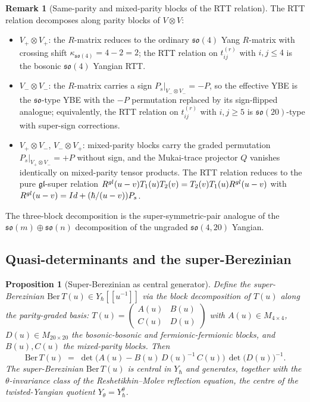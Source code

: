 \documentclass{article}
\providecommand{\fgl}{\mathfrak{gl}}
\providecommand{\fso}{\mathfrak{so}}
\providecommand{\Id}{\mathrm{Id}}
\providecommand{\Ber}{\mathrm{Ber}}
\newtheorem{proposition}[theorem]{Proposition}
\theoremstyle{definition}
\newtheorem{remark}[theorem]{Remark}
\begin{document}
\begin{remark}[Same-parity and mixed-parity blocks of the RTT relation]
\label{rem:r10-RTT-block-structure}
The RTT relation decomposes along parity blocks of $V \otimes V$:
\begin{itemize}
\item $V_+ \otimes V_+$: the $R$-matrix reduces to the ordinary
  $\fso(4)$ Yang $R$-matrix with crossing shift $\kappa_{\fso(4)} =
  4 - 2 = 2$; the RTT relation on $t^{(r)}_{ij}$ with $i, j \leq 4$
  is the bosonic $\fso(4)$ Yangian RTT.
\item $V_- \otimes V_-$: the $R$-matrix carries a sign
  $P_s|_{V_- \otimes V_-} = -P$, so the effective YBE is the
  $\fso$-type YBE with the $-P$ permutation replaced by its
  sign-flipped analogue; equivalently, the RTT relation on
  $t^{(r)}_{ij}$ with $i, j \geq 5$ is $\fso(20)$-type with
  super-sign corrections.
\item $V_+ \otimes V_-$, $V_- \otimes V_+$: mixed-parity blocks
  carry the graded permutation $P_s|_{V_+ \otimes V_-} = +P$ without
  sign, and the Mukai-trace projector $Q$ vanishes identically on
  mixed-parity tensor products. The RTT relation reduces to the
  pure $\fgl$-super relation
  $R^{gl}(u-v) T_1(u) T_2(v) = T_2(v) T_1(u) R^{gl}(u-v)$ with
  $R^{\gl}(u-v) = \Id + (\hbar / (u-v)) P_s$.
\end{itemize}
The three-block decomposition is the super-symmetric-pair analogue
of the $\fso(m) \oplus \fso(n)$ decomposition of the ungraded
$\fso(4, 20)$ Yangian.
\end{remark}

\subsection{Quasi-determinants and the super-Berezinian}

\begin{proposition}[Super-Berezinian as central generator]
\label{prop:r10-super-Berezinian}
Define the \emph{super-Berezinian} $\Ber\, T(u) \in Y_\hbar[[u^{-1}]]$
via the block decomposition of $T(u)$ along the parity-graded basis:
$T(u) = \begin{pmatrix} A(u) & B(u) \\ C(u) & D(u) \end{pmatrix}$
with $A(u) \in M_{4 \times 4}$, $D(u) \in M_{20 \times 20}$ the
bosonic-bosonic and fermionic-fermionic blocks, and $B(u), C(u)$
the mixed-parity blocks. Then
\begin{equation}\label{eq:r10-super-Ber}
  \Ber\, T(u)
  \;=\;
  \det\bigl( A(u) - B(u)\, D(u)^{-1}\, C(u)\bigr)\,
  \det\bigl( D(u)\bigr)^{-1}.
\end{equation}
The super-Berezinian $\Ber\, T(u)$ is central in $Y_\hbar$ and
generates, together with the $\theta$-invariance class of the
Reshetikhin--Molev reflection equation, the centre of the
twisted-Yangian quotient $Y_\theta = Y_\hbar^\theta$.
\end{proposition}
\end{document}
